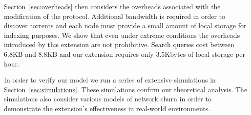 Section~\ref{sec:overheads} then considers the overheads associated with the modification of the protocol. Additional bandwidth is required in order to discover torrents and each node must provide a small amount of local storage for indexing purposes. We show that even under extreme conditions the overheads introduced by this extension are not prohibitive. Search queries cost between 6.8KB and 8.8KB and our extension requires only 3.5Kbytes of local storage per hour.

In order to verify our model we run a series of extensive simulations in Section~\ref{sec:simulations}. These simulations confirm our theoretical analysis. The simulations also consider various models of network churn in order to demonstrate the extension's effectiveness in real-world environments.
